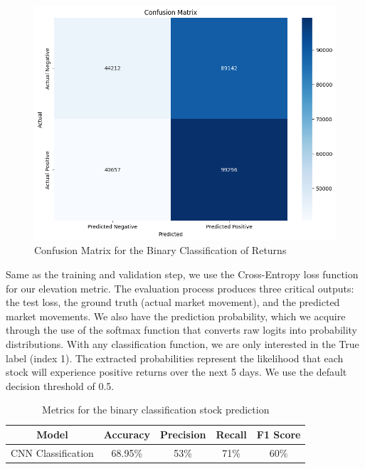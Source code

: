 \documentclass[12pt]{article}
\begin{document}
\begin{figure}[h]
	\centering
	\includegraphics[width=.85\linewidth]{plots/confusion_matrix.png}
	\caption{Confusion Matrix for the Binary Classification of Returns}
	\label{fig:confusion_matrix}
\end{figure}

Same as the training and validation step, we use the Cross-Entropy loss function for our elevation metric. The evaluation process produces three critical outputs: the test loss, the ground truth (actual market movement), and the predicted market movements. We also have the prediction probability, which we acquire through the use of the softmax function that converts raw logits into probability distributions. With any classification function, we are only interested in the True label (index 1). The extracted probabilities represent the likelihood that each stock will experience positive returns over the next 5 days. We use the default decision threshold of 0.5.

\begin{table}[ht]
	\centering
	\caption{Metrics for the binary classification stock prediction}
	\begin{tabular}[t]{ccccc}
		\toprule
		Model & Accuracy & Precision & Recall & F1 Score \\
		\midrule
		CNN Classification & 68.95\% & 53\% & 71\% & 60\%  \\			
		\bottomrule
	\end{tabular}\label{tab:metrics}
\end{table}
\end{document}
